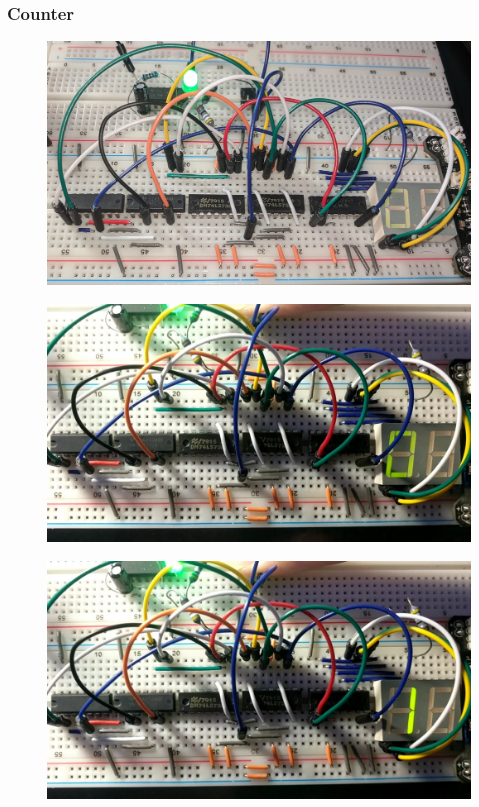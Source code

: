 \documentclass{article}
\begin{document}
\newpage
\subsubsection*{Counter}
\begin{figure}[ht!]
  \centering
  \includegraphics[width=\textwidth]{ECE2300L_Lab12_Counter.jpg}
\end{figure}
\begin{figure}[ht!]
  \centering
  \includegraphics[width=\textwidth]{ECE2300L_Lab12_0.jpg}
\end{figure}
\begin{figure}[ht!]
  \centering
  \includegraphics[width=\textwidth]{ECE2300L_Lab12_1.jpg}
\end{figure}
\end{document}
